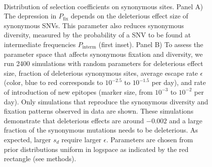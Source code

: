 \documentclass[11pt]{article}
\newcommand{\pfix}{P_{\mathrm{fix}}}
\begin{document}
\begin{figure}
\begin{center}
\\
\caption{Distribution of selection coefficients on synonymous sites. Panel A)
The depression in $\pfix$ depends on the deleterious effect size 
of synonymous SNVs. This parameter also reduces synonymous
diversity, measured by the probability of a SNV to be found at
intermediate frequencies $P_\text{interm}$ (first inset).
Panel B) To assess the parameter space that affects synonymous fixation and
diversity, we run 2400 simulations with random parameters for deleterious effect
size, fraction of deleterious synonymous sites, average escape rate $\epsilon$
(color, blue to red corresponds to $10^{-2.5}$ to $10^{-1.5}$ per day), and rate of
introduction of new epitopes (marker size, from $10^{-3}$ to $10^{-2}$ per
day). Only simulations that reproduce the synonymous diversity and fixation
patterns observed in data are shown. These simulations demonstrate that
deleterious effects are around $-0.002$ and a large fraction of the 
synonymous mutations needs to be deleterious. As expected, larger
$s_d$ require larger $\epsilon$. Parameters are chosen
from prior distributions uniform in logspace as indicated by the red rectangle
(see methods).}
\label{fig:simheat}
\end{center}
\end{figure}

%
\end{document}
